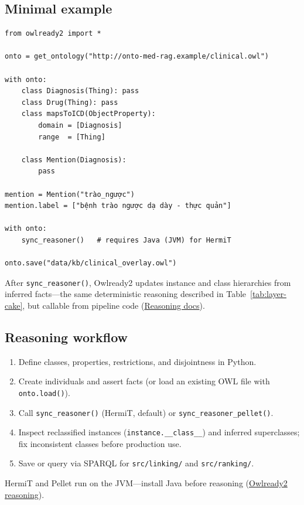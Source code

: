 \subsection{Minimal example}

\begin{verbatim}
from owlready2 import *

onto = get_ontology("http://onto-med-rag.example/clinical.owl")

with onto:
    class Diagnosis(Thing): pass
    class Drug(Thing): pass
    class mapsToICD(ObjectProperty):
        domain = [Diagnosis]
        range  = [Thing]

    class Mention(Diagnosis):
        pass

mention = Mention("trào_ngược")
mention.label = ["bệnh trào ngược dạ dày - thực quản"]

with onto:
    sync_reasoner()   # requires Java (JVM) for HermiT

onto.save("data/kb/clinical_overlay.owl")
\end{verbatim}

After \texttt{sync\_reasoner()}, Owlready2 updates instance and class hierarchies
from inferred facts---the same deterministic reasoning described in
Table~\ref{tab:layer-cake}, but callable from pipeline code
(\href{https://owlready2.readthedocs.io/en/latest/reasoning.html}{Reasoning docs}).

\subsection{Reasoning workflow}

\begin{enumerate}
  \item Define classes, properties, restrictions, and disjointness in Python.
  \item Create individuals and assert facts (or load an existing OWL file with
        \texttt{onto.load()}).
  \item Call \texttt{sync\_reasoner()} (HermiT, default) or
        \texttt{sync\_reasoner\_pellet()}.
  \item Inspect reclassified instances (\texttt{instance.\_\_class\_\_}) and inferred
        superclasses; fix inconsistent classes before production use.
  \item Save or query via SPARQL for \texttt{src/linking/} and
        \texttt{src/ranking/}.
\end{enumerate}

HermiT and Pellet run on the JVM---install Java before reasoning
(\href{https://owlready2.readthedocs.io/en/latest/reasoning.html}{Owlready2 reasoning}).


